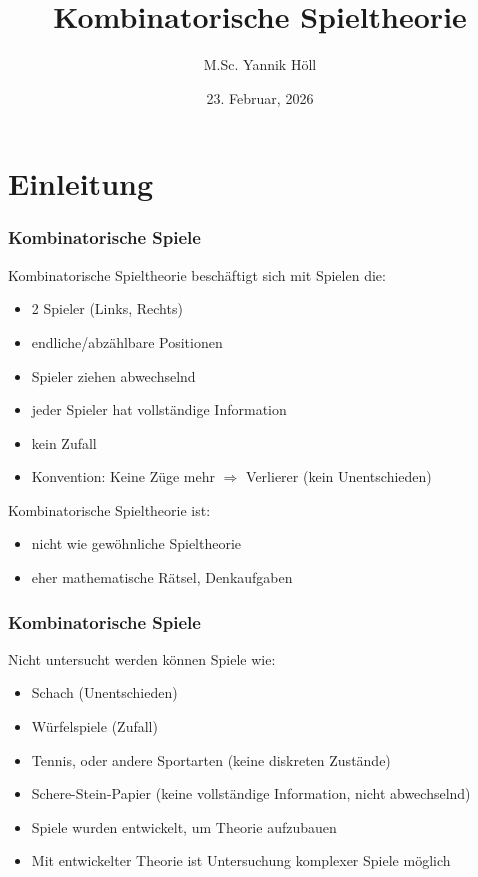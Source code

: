 \documentclass[12pt, aspectratio=169]{beamer}
\title{Kombinatorische Spieltheorie}
\author[M.Sc. Y. Höll]{M.Sc. Yannik Höll}
\date{23. Februar, 2026}
\begin{document}
\begin{frame}
	\titlepage
\end{frame}

\section{Einleitung}
\begin{frame}
    \frametitle{Kombinatorische Spiele}
    Kombinatorische Spieltheorie beschäftigt sich mit Spielen die:

\begin{itemize}
    \item 2 Spieler (Links, Rechts)
    \item endliche/abzählbare Positionen
    \item Spieler ziehen abwechselnd
    \item jeder Spieler hat vollständige Information
    \item kein Zufall
    \item Konvention: Keine Züge mehr $\Rightarrow$ Verlierer (kein Unentschieden)
\end{itemize}

 {
Kombinatorische Spieltheorie ist:
\begin{itemize}
    \item nicht wie gewöhnliche Spieltheorie
    \item eher mathematische Rätsel, Denkaufgaben
\end{itemize}
}
\end{frame}

\begin{frame}
\frametitle{Kombinatorische Spiele}

Nicht untersucht werden können Spiele wie:
\begin{itemize}
    \item<2-> Schach (Unentschieden)
    \item<3-> Würfelspiele (Zufall)
    \item<4-> Tennis, oder andere Sportarten (keine diskreten Zustände)
    \item<5-> Schere-Stein-Papier (keine vollständige Information, nicht abwechselnd)
\end{itemize}

 {
    \begin{itemize}
        \item Spiele wurden entwickelt, um Theorie aufzubauen
        \item Mit entwickelter Theorie ist Untersuchung komplexer Spiele möglich 
    \end{itemize}
}

\end{frame}
\end{document}

